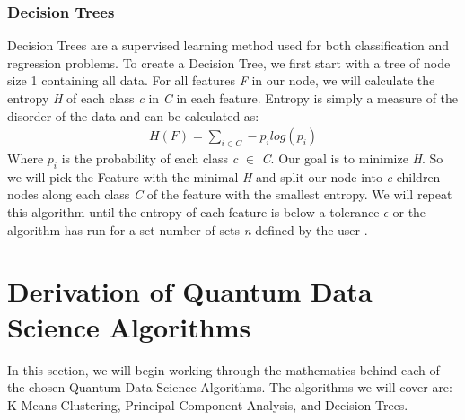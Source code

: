 \documentclass[conference]{IEEEtran}
\begin{document}
\subsubsection{Decision Trees}
Decision Trees are a supervised learning method used for both classification and regression problems. To create a Decision Tree, we first start with a tree of node size 1 containing all data. For all features \emph{F} in our node, we will calculate the entropy \emph{H} of each class \emph{c} in \emph{C} in each feature. Entropy is simply a measure of the disorder of the data and can be calculated as:
\begin{align*}
    H(F) = \sum_{i\in C} -p_i log(p_i)
\end{align*}
Where \emph{$p_i$} is the probability of each class \emph{c} $\in$ \emph{C}. Our goal is to minimize \emph{H}. So we will pick the Feature with the minimal \emph{H} and split our node into \emph{c} children nodes along each class \emph{C} of the feature with the smallest entropy. We will repeat this algorithm until the entropy of each feature is below a tolerance $\epsilon$ or the algorithm has run for a set number of sets \emph{n} defined by the user \cite{b11}. 

\section{Derivation of Quantum Data Science Algorithms}
In this section, we will begin working through the mathematics behind each of the chosen Quantum Data Science Algorithms. The algorithms we will cover are: K-Means Clustering, Principal Component Analysis, and Decision Trees.   
\end{document}
